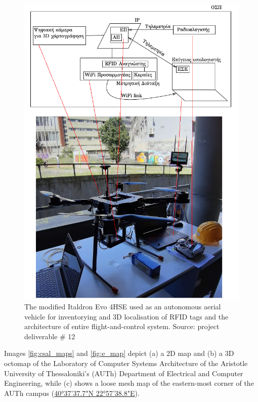 \begin{figure}[H]\centering
  \includegraphics[scale=0.6]{images/relief/drone/drone_arch_corr.png}
  \caption{\small The modified Italdron Evo 4HSE used as an autonomous aerial
           vehicle for inventorying and 3D localisation of RFID tags and the
           architecture of entire flight-and-control system. Source: project
           deliverable \# 12}
  \label{fig:relief_drone}
\end{figure}

Images \ref{fig:csal_maps} and \ref{fig:e_map} depict (a) a 2D map and (b) a 3D
octomap of the Laboratory of Computer Systems Architecture of the Aristotle
University of Thessaloniki's (AUTh) Department of Electrical and Computer
Engineering, while (c) shows a loose mesh map of the eastern-most corner of
the AUTh campus (\href{https://maps.app.goo.gl/zDzM8HKzkMiFyHMJ6}{40°37'37.7"N
22°57'38.8"E}).

